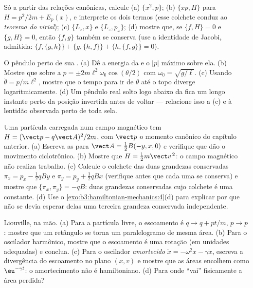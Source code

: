 \begin{exercise}[$\star$]\label{exo:b3:hamiltonian-mechanics:4}
Só a partir das relações canônicas, calcule (a) $\{x^2, p\}$; (b)
$\{xp, H\}$ para $H = p^2/2m + E_p(x)$, e interprete os dois termos
(esse colchete conduz ao \emph{teorema do virial}); (c) $\{L_z, x\}$ e
$\{L_z, p_x\}$; (d) mostre que, se $\{f, H\} = 0$ e $\{g, H\} = 0$,
então $\{f, g\}$ também se conserva (use a identidade de Jacobi,
admitida: $\{f,\{g,h\}\} + \{g,\{h,f\}\} + \{h,\{f,g\}\} = 0$).
\end{exercise}

\begin{exercise}[$\star\star$]\label{exo:b3:hamiltonian-mechanics:5}
O pêndulo perto de sua . (a) Dê a energia da  e o
$|p|$ máximo sobre ela. (b) Mostre que sobre a  $p =
\pm 2m\ell^2\omega_0\cos(\theta/2)$ com $\omega_0 = \sqrt{g/\ell}$.
(c) Usando $\dot\theta = p/m\ell^2$, mostre que o tempo para ir de
$\theta$ até o topo diverge logaritmicamente. (d) Um pêndulo real
solto logo abaixo da  fica um longo instante perto da posição
invertida antes de voltar --- relacione isso a (c) e à lentidão
observada perto de toda sela.
\end{exercise}

\begin{exercise}[$\star\star$]\label{exo:b3:hamiltonian-mechanics:6}
Uma partícula carregada num campo magnético tem $H = (\vect p -
q\vect A)^2/2m$, com $\vect p$ o momento canônico do capítulo
anterior. (a) Escreva as  para $\vect A = \tfrac12
B(-y, x, 0)$ e verifique que dão o movimento ciclotrônico. (b) Mostre que $H =
\tfrac12 m\vect v^{\,2}$: o campo magnético não realiza trabalho. (c)
Calcule o colchete das duas grandezas conservadas $\pi_x = p_x - \tfrac12
qBy$ e $\pi_y = p_y + \tfrac12 qBx$ (verifique antes que cada uma se
conserva) e mostre que $\{\pi_x, \pi_y\} = -qB$: duas grandezas
conservadas cujo colchete é uma constante. (d) Use o
\cref{exo:b3:hamiltonian-mechanics:4}(d) para explicar por que não se
devia esperar delas uma terceira grandeza conservada independente.
\end{exercise}

\begin{exercise}[$\star\star$]\label{exo:b3:hamiltonian-mechanics:7}
Liouville, na mão. (a) Para a partícula livre, o escoamento é $q \to q +
pt/m$, $p \to p$: mostre que um retângulo se torna um paralelogramo de
mesma área. (b) Para o oscilador harmônico, mostre que o escoamento é
uma rotação (em unidades adequadas) e conclua. (c) Para o oscilador
\emph{amortecido} $\ddot x = -\omega^2x - \gamma\dot x$, escreva a
divergência do escoamento no plano $(x, v)$ e mostre que as áreas
encolhem como $\eu^{-\gamma t}$: o amortecimento não é hamiltoniano.
(d) Para onde ``vai'' fisicamente a área perdida?
\end{exercise}

